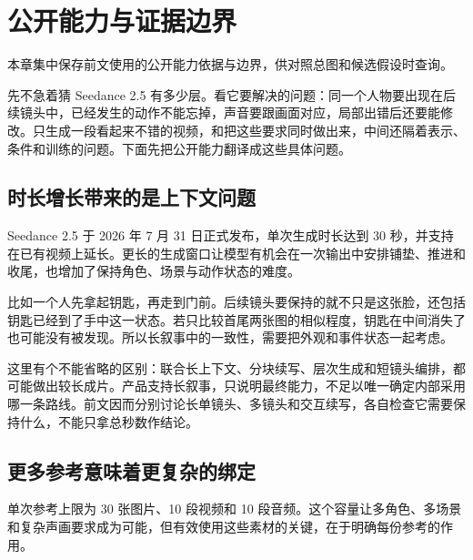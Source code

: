 \chapter{公开能力与证据边界}\label{seedance-m00}

本章集中保存前文使用的公开能力依据与边界，供对照总图和候选假设时查询。

先不急着猜 Seedance 2.5 有多少层。看它要解决的问题：同一个人物要出现在后续镜头中，已经发生的动作不能忘掉，声音要跟画面对应，局部出错后还要能修改。只生成一段看起来不错的视频，和把这些要求同时做出来，中间还隔着表示、条件和训练的问题。下面先把公开能力翻译成这些具体问题。

\section{时长增长带来的是上下文问题}\label{seedance-m00-ux65f6ux957fux589eux957fux5e26ux6765ux7684ux662fux4e0aux4e0bux6587ux95eeux9898}

Seedance 2.5 于 2026 年 7 月 31 日正式发布，单次生成时长达到 30 秒，并支持在已有视频上延长。更长的生成窗口让模型有机会在一次输出中安排铺垫、推进和收尾，也增加了保持角色、场景与动作状态的难度。

比如一个人先拿起钥匙，再走到门前。后续镜头要保持的就不只是这张脸，还包括钥匙已经到了手中这一状态。若只比较首尾两张图的相似程度，钥匙在中间消失了也可能没有被发现。所以长叙事中的一致性，需要把外观和事件状态一起考虑。

这里有个不能省略的区别：联合长上下文、分块续写、层次生成和短镜头编排，都可能做出较长成片。产品支持长叙事，只说明最终能力，不足以唯一确定内部采用哪一条路线。前文因而分别讨论长单镜头、多镜头和交互续写，各自检查它需要保持什么，不能只拿总秒数作结论。

\section{更多参考意味着更复杂的绑定}\label{seedance-m00-ux66f4ux591aux53c2ux8003ux610fux5473ux7740ux66f4ux590dux6742ux7684ux7ed1ux5b9a}

单次参考上限为 30 张图片、10 段视频和 10 段音频。这个容量让多角色、多场景和复杂声画要求成为可能，但有效使用这些素材的关键，在于明确每份参考的作用。

